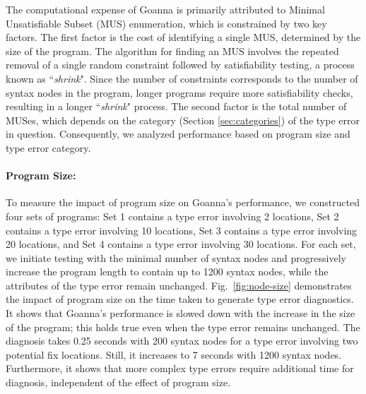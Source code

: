 \documentclass[pdflatex,lineno,sn-nature,Numbered]{sn-jnl}%
\begin{document}
The computational expense of Goanna is primarily attributed to Minimal Unsatisfiable Subset (MUS) enumeration, which is constrained by two key factors. The first factor is the cost of identifying a single MUS, determined by the size of the program. The algorithm for finding an MUS involves the repeated removal of a single random constraint followed by satisfiability testing, a process known as ``{\it shrink}". Since the number of constraints corresponds to the number of syntax nodes in the program, longer programs require more satisfiability checks, resulting in a longer ``{\it shrink}" process. The second factor is the total number of MUSes, which depends on the category (Section \ref{sec:categories}) of the type error in question. Consequently, we analyzed performance based on program size and type error category.

\paragraph{Program Size:}
To measure the impact of program size on Goanna's performance, we constructed four sets of programs: Set 1 contains a type error involving 2 locations, Set 2 contains a type error involving 10 locations, Set 3 contains a type error involving 20 locations, and Set 4 contains a type error involving 30 locations. For each set, we initiate testing with the minimal number of syntax nodes and progressively increase the program length to contain up to 1200 syntax nodes, while the attributes of the type error remain unchanged. Fig.~\ref{fig:node-size} demonstrates the impact of program size on the time taken to generate type error diagnostics. It shows that Goanna's performance is slowed down with the increase in the size of the program; this holds true even when the type error remains unchanged. The diagnosis takes 0.25 seconds with 200 syntax nodes for a type error involving two potential fix locations. Still, it increases to 7 seconds with 1200 syntax nodes. Furthermore, it shows that more complex type errors require additional time for diagnosis, independent of the effect of program size.
\end{document}
